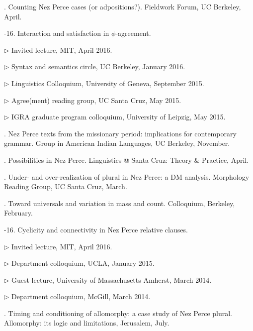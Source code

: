 \documentclass[12pt]{article}
\begin{document}







. Counting Nez Perce cases (or adpositions?). Fieldwork Forum, UC Berkeley, April.



-16. Interaction and satisfaction in $\phi$-agreement. %

\indd $\rhd$ Invited lecture, MIT, April 2016.

\indd $\rhd$ Syntax and semantics circle, UC Berkeley, January 2016.  

\indd $\rhd$ Linguistics Colloquium, University of Geneva, September 2015.

\indd $\rhd$ Agree(ment) reading group, UC Santa Cruz, May 2015. 

\indd $\rhd$ IGRA graduate program colloquium, University of Leipzig, May 2015.






. Nez Perce texts from the missionary period: implications for contemporary grammar. Group in American Indian Languages, UC Berkeley, November. 


. Possibilities in Nez Perce.  Linguistics @ Santa Cruz: Theory \& Practice, April. 

. Under- and over-realization of plural in Nez Perce: a DM analysis. Morphology Reading Group, UC Santa Cruz, March.

. Toward universals and variation in mass and count. Colloquium, Berkeley, February.



-16. Cyclicity and connectivity in Nez Perce relative clauses.  \nopagebreak

\indd $\rhd$ Invited lecture, MIT, April 2016.

\indd $\rhd$ Department colloquium, UCLA, January 2015. 

\indd $\rhd$ Guest lecture, University of Massachusetts Amherst, March 2014. 

\indd $\rhd$ Department colloquium, McGill, March 2014. 






. Timing and conditioning of allomorphy: a case study of Nez Perce plural. Allomorphy: its logic and limitations, Jerusalem, July. 
\end{document}
